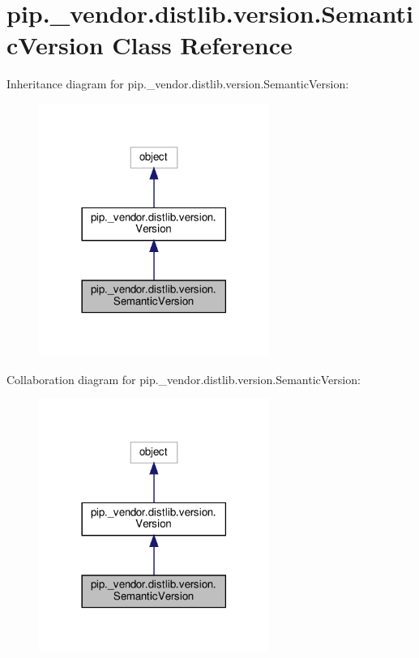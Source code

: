 \hypertarget{classpip_1_1__vendor_1_1distlib_1_1version_1_1SemanticVersion}{}\section{pip.\+\_\+vendor.\+distlib.\+version.\+Semantic\+Version Class Reference}
\label{classpip_1_1__vendor_1_1distlib_1_1version_1_1SemanticVersion}


Inheritance diagram for pip.\+\_\+vendor.\+distlib.\+version.\+Semantic\+Version\+:
\nopagebreak
\begin{figure}[H]
\begin{center}
\leavevmode
\includegraphics[width=213pt]{classpip_1_1__vendor_1_1distlib_1_1version_1_1SemanticVersion__inherit__graph}
\end{center}
\end{figure}


Collaboration diagram for pip.\+\_\+vendor.\+distlib.\+version.\+Semantic\+Version\+:
\nopagebreak
\begin{figure}[H]
\begin{center}
\leavevmode
\includegraphics[width=213pt]{classpip_1_1__vendor_1_1distlib_1_1version_1_1SemanticVersion__coll__graph}
\end{center}
\end{figure}
